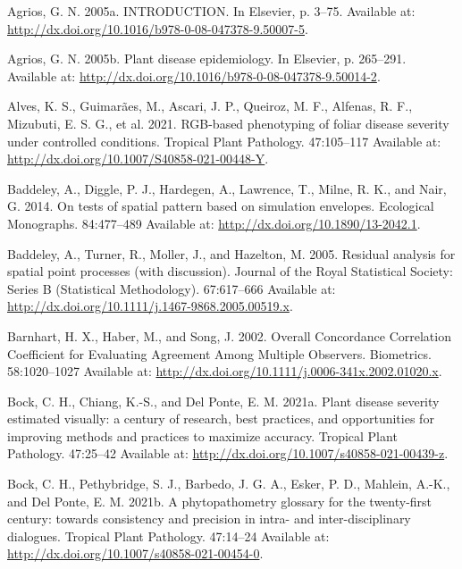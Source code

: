 \documentclass[
  letterpaper,
  DIV=11,
  numbers=noendperiod]{scrreprt}
\newlength{\cslhangindent}
\newlength{\cslentryspacingunit} %
\newenvironment{CSLReferences}[2] %
 {%
  \setlength{\parindent}{0pt}
  \ifodd #1
  \let\oldpar\par
  \def\par{\hangindent=\cslhangindent\oldpar}
  \fi
  \setlength{\parskip}{#2\cslentryspacingunit}
 }%
 {}
\begin{document}
\hypertarget{refs}{}
\begin{CSLReferences}{0}{0}
\leavevmode{}%
Agrios, G. N. 2005a. INTRODUCTION. In Elsevier, p. 3--75. Available at:
\url{http://dx.doi.org/10.1016/b978-0-08-047378-9.50007-5}.

\leavevmode{}%
Agrios, G. N. 2005b. Plant disease epidemiology. In Elsevier, p.
265--291. Available at:
\url{http://dx.doi.org/10.1016/b978-0-08-047378-9.50014-2}.

\leavevmode{}%
Alves, K. S., Guimarães, M., Ascari, J. P., Queiroz, M. F., Alfenas, R.
F., Mizubuti, E. S. G., et al. 2021. RGB-based phenotyping of foliar
disease severity under controlled conditions. Tropical Plant Pathology.
47:105--117 Available at:
\url{http://dx.doi.org/10.1007/S40858-021-00448-Y}.

\leavevmode{}%
Baddeley, A., Diggle, P. J., Hardegen, A., Lawrence, T., Milne, R. K.,
and Nair, G. 2014. On tests of spatial pattern based on simulation
envelopes. Ecological Monographs. 84:477--489 Available at:
\url{http://dx.doi.org/10.1890/13-2042.1}.

\leavevmode{}%
Baddeley, A., Turner, R., Moller, J., and Hazelton, M. 2005. Residual
analysis for spatial point processes (with discussion). Journal of the
Royal Statistical Society: Series B (Statistical Methodology).
67:617--666 Available at:
\url{http://dx.doi.org/10.1111/j.1467-9868.2005.00519.x}.

\leavevmode{}%
Barnhart, H. X., Haber, M., and Song, J. 2002. Overall Concordance
Correlation Coefficient for Evaluating Agreement Among Multiple
Observers. Biometrics. 58:1020--1027 Available at:
\url{http://dx.doi.org/10.1111/j.0006-341x.2002.01020.x}.

\leavevmode{}%
Bock, C. H., Chiang, K.-S., and Del Ponte, E. M. 2021a. Plant disease
severity estimated visually: a century of research, best practices, and
opportunities for improving methods and practices to maximize accuracy.
Tropical Plant Pathology. 47:25--42 Available at:
\url{http://dx.doi.org/10.1007/s40858-021-00439-z}.

\leavevmode{}%
Bock, C. H., Pethybridge, S. J., Barbedo, J. G. A., Esker, P. D.,
Mahlein, A.-K., and Del Ponte, E. M. 2021b. A phytopathometry glossary
for the twenty-first century: towards consistency and precision in
intra- and inter-disciplinary dialogues. Tropical Plant Pathology.
47:14--24 Available at:
\url{http://dx.doi.org/10.1007/s40858-021-00454-0}.


\end{CSLReferences}
\end{document}
